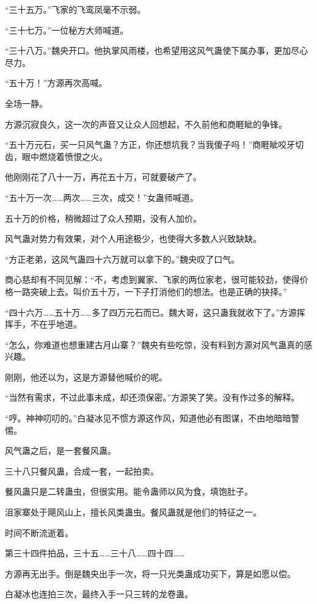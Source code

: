 \begin{this_body}
“三十五万。”飞家的飞鸾凤毫不示弱。

“三十七万。”一位秘方大师喊道。

“三十八万。”魏央开口。他执掌风雨楼，也希望用这风气蛊使下属办事，更加尽心尽力。

“五十万！”方源再次高喊。

全场一静。

方源沉寂良久，这一次的声音又让众人回想起，不久前他和商睚眦的争锋。

“五十万元石，买一只风气蛊？方正，你还想坑我？当我傻子吗！”商睚眦咬牙切齿，眼中燃烧着愤恨之火。

他刚刚花了八十一万，再花五十万，可就要破产了。

“五十万一次……两次……三次，成交！”女蛊师喊道。

五十万的价格，稍微超过了众人预期，没有人加价。

风气蛊对势力有效果，对个人用途极少，也使得大多数人兴致缺缺。

“方正老弟，这风气蛊四十六万就可以拿下的。”魏央叹了口气。

商心慈却有不同见解：“不，考虑到翼家、飞家的两位家老，很可能较劲，使得价格一路突破上去。叫价五十万，一下子打消他们的想法。也是正确的抉择。”

“四十六万……五十万……多了四万元石而已。魏大哥，这只蛊我就收下了。”方源挥挥手，不在乎地道。

“怎么，你难道也想重建古月山寨？”魏央有些吃惊，没有料到方源对风气蛊真的感兴趣。

刚刚，他还以为，这是方源替他喊价的呢。

“当然有需求，不过此事未成，却还须保密。”方源笑了笑。没有作过多的解释。

“哼。神神叨叨的。”白凝冰见不惯方源这作风，知道他必有图谋，不由地暗暗警惕。

风气蛊之后，是一套餐风蛊。

三十八只餐风蛊，合成一套，一起拍卖。

餐风蛊只是二转蛊虫，但很实用。能令蛊师以风为食，填饱肚子。

沮家寨处于飓风山上，擅长风类蛊虫。餐风蛊就是他们的特征之一。

时间不断流逝着。

第三十四件拍品，三十五……三十八……四十四……

方源再无出手。倒是魏央出手一次，将一只光类蛊成功买下，算是如愿以偿。

白凝冰也连拍三次，最终入手一只三转的龙卷蛊。


\end{this_body}
